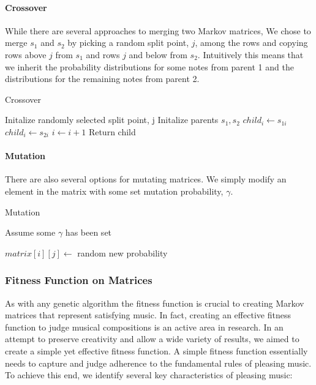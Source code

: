 \documentclass{article}
\begin{document}
\paragraph{Crossover} While there are several approaches to merging two Markov matrices, We chose to merge $s_1$ and $s_2$ by picking a random split point, $j$, among the rows and copying rows above $j$ from $s_1$ and rows $j$ and below from $s_2$. Intuitively this means that we inherit the probability distributions for some notes from parent 1 and the distributions for the remaining notes from parent 2.

\begin{algorithm}[H]
  \caption{Crossover}
  \begin{algorithmic}
    \State Initalize randomly selected split point, j
    \State Initalize parents $s_1, s_2$
    \State $child_i \gets s_{1i}$
    \EndIf
    \State $child_i \gets s_{2i}$
    \EndIf
    \State $i \gets i + 1$
    \EndWhile
    \State Return child  
  \end{algorithmic}
\end{algorithm}


\paragraph{Mutation} There are also several options for mutating matrices. We simply modify an element in the matrix with some set mutation probability, $\gamma$.

\begin{algorithm}[H]
  \caption{Mutation}
  \begin{algorithmic}
    \State Assume some $\gamma$ has been set

    \State $matrix[i][j] \gets $ random new probability
    \EndIf
    \EndWhile
    \EndWhile
  \end{algorithmic}
\end{algorithm}



\subsubsection{Fitness Function on Matrices}

As with any genetic algorithm the fitness function is crucial to creating Markov matrices that represent satisfying music. In fact, creating an effective fitness function to judge musical compositions is an active area in research. In an attempt to preserve creativity and allow a wide variety of results, we aimed to create a simple yet effective fitness function. A simple fitness function essentially needs to capture and judge adherence to the fundamental rules of pleasing music. To achieve this end, we identify several key characteristics of pleasing music:
\end{document}
